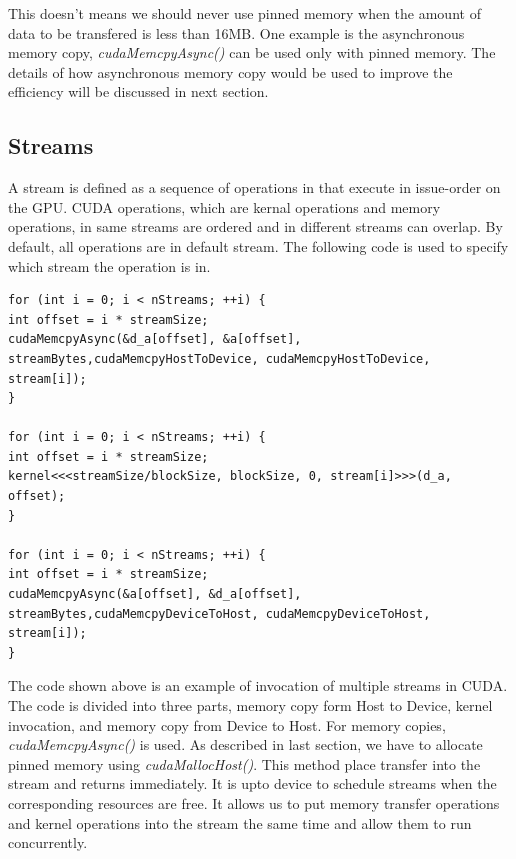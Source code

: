 \documentclass[journal,12pt,onecolumn,draftclsnofoot]{ieeeconf}  %
\begin{document}
This doesn't means we should never use pinned memory when the amount of data to be transfered is less than 16MB. One example is the asynchronous memory copy, \textit{cudaMemcpyAsync()} can be used only with pinned memory. The details of how asynchronous memory copy would be used to improve the efficiency will be discussed in next section.

\subsection{Streams}
A stream is defined as a sequence of operations in that execute in issue-order on the GPU. CUDA operations, which are kernal operations and memory operations, in same streams are ordered and in different streams can overlap. By default, all operations are in default stream. The following code is used to specify which stream the operation is in. \par
\begin{lstlisting}
for (int i = 0; i < nStreams; ++i) {
int offset = i * streamSize;
cudaMemcpyAsync(&d_a[offset], &a[offset], streamBytes,cudaMemcpyHostToDevice, cudaMemcpyHostToDevice, stream[i]);
}

for (int i = 0; i < nStreams; ++i) {
int offset = i * streamSize;
kernel<<<streamSize/blockSize, blockSize, 0, stream[i]>>>(d_a, offset);
}

for (int i = 0; i < nStreams; ++i) {
int offset = i * streamSize;
cudaMemcpyAsync(&a[offset], &d_a[offset], streamBytes,cudaMemcpyDeviceToHost, cudaMemcpyDeviceToHost, stream[i]);
}

\end{lstlisting}
The code shown above is an example of invocation of multiple streams in CUDA. The code is divided into three parts, memory copy form Host to Device, kernel invocation, and memory copy from Device to Host. For memory copies, \textit{cudaMemcpyAsync()} is used. As described in last section, we have to allocate pinned memory using \textit{cudaMallocHost()}. This method place transfer into the stream and returns immediately. It is upto device to schedule streams when the corresponding resources are free. It allows us to put memory transfer operations and kernel operations into the stream the same time and allow them to run concurrently. \par
\end{document}
